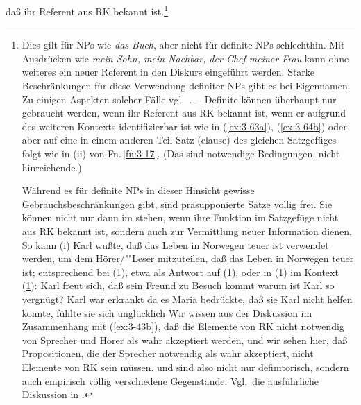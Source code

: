 \documentclass[output=paper]{langsci/langscibook}
\begin{document}
daß ihr Referent aus RK bekannt ist.\footnote{\label{fn:3-23}%
    Dies gilt für NPs wie \textit{das Buch}, aber nicht für definite NPs
  schlechthin. Mit Ausdrücken wie \textit{mein Sohn, mein Nachbar, der Chef
  meiner Frau} kann ohne weiteres ein neuer Referent in den Diskurs
  eingeführt werden. Starke Beschränkungen für diese Verwendung
  definiter NPs gibt es bei Eigennamen. Zu einigen Aspekten solcher
  Fälle vgl.\ \citet{Prince78, Prince79}.~-- Definite  können überhaupt nur gebraucht werden, wenn ihr Referent aus RK bekannt ist, \dash wenn er aufgrund des weiteren
  Kontexts identifizierbar ist wie in (\ref{ex:3-63a}), (\ref{ex:3-64b}) oder aber auf eine
    in einem anderen Teil-Satz (clause) des gleichen Satzgefüges folgt wie \zb in (ii) von Fn.\,\ref{fn:3-17}. (Das sind notwendige Bedingungen, nicht hinreichende.) 

  Während es für definite
  NPs in dieser Hinsicht gewisse Gebrauchsbeschränkungen gibt, sind präsupponierte Sätze völlig frei. Sie können nicht nur dann im  stehen, wenn ihre Funktion im Satzgefüge nicht aus RK bekannt ist, sondern auch zur Vermittlung neuer Information dienen. So kann (i)
  \ea
  \label{ex:3-23i}
  Karl wußte, daß das Leben in Norwegen teuer ist
  \z
  verwendet werden, um dem Hörer/""Leser mitzuteilen, daß das Leben in
  Norwegen teuer ist; entsprechend \zb bei (\ref{ex:3-23iia}), etwa als Antwort
  auf (\ref{ex:3-23iib}), oder in (\ref{ex:3-23iiib}) im Kontext (\ref{ex:3-23iiia}):
  \eal
  \label{ex:3-23ii}
  \ex
  \label{ex:3-23iia}
  Karl freut sich, daß sein Freund zu Besuch kommt
  \ex
  \label{ex:3-23iib}
  warum ist Karl so vergnügt?
  \zlmid
  \eal
  \label{ex:3-23iii}
  \ex
  \label{ex:3-23iiia}
  Karl war erkrankt
  \ex
  \label{ex:3-23iiib}
  da es Maria bedrückte, daß sie Karl nicht helfen konnte, fühlte sie
  sich unglücklich
  \zl
  Wir wissen aus der Diskussion im Zusammenhang mit (\ref{ex:3-43b}), daß die
  Elemente von RK nicht notwendig von Sprecher und Hörer als wahr
  akzeptiert werden, und wir sehen hier, daß Propositionen, die der
  Sprecher notwendig als wahr akzeptiert, nicht Elemente von RK sein
  müssen.  und  sind also nicht nur definitorisch, sondern auch empirisch völlig verschiedene Gegenstände. Vgl.\ die ausführliche
  Diskussion in \citet[3.3.3]{Reis77}.

}
\end{document}
